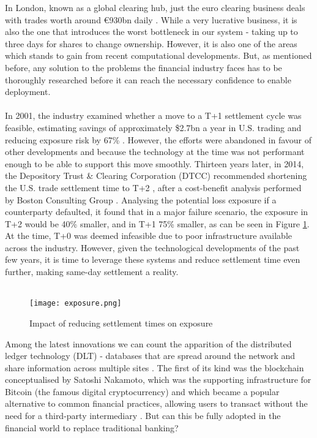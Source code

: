 \documentclass[12pt,twoside]{article}
\begin{document}
In London, known as a global clearing hub, just the euro clearing business deals with trades worth around \euro{930}bn daily \cite{euroclearing}. While a very lucrative business, it is also the one that introduces the worst bottleneck in our system - taking up to three days for shares to change ownership. However, it is also one of the areas which stands to gain from recent computational developments. But, as mentioned before, any solution to the problems the financial industry faces has to be thoroughly researched before it can reach the necessary confidence to enable deployment.
\\ \\
In 2001, the industry examined whether a move to a T+1 settlement cycle was feasible, estimating savings of approximately \$2.7bn a year in U.S. trading \cite{sia} and reducing exposure risk by 67\% \cite{oldletter}. However, the efforts were abandoned in favour of other developments and because the technology at the time was not performant enough to be able to support this move smoothly. Thirteen years later, in 2014, the Depository Trust \& Clearing Corporation (DTCC) recommended shortening the U.S. trade settlement time to T+2 \cite{dtcc}, after a cost-benefit analysis performed by Boston Consulting Group \cite{bcg}. Analysing the potential loss exposure if a counterparty defaulted, it found that in a major failure scenario, the exposure in T+2 would be 40\% smaller, and in T+1 75\% smaller, as can be seen in Figure \ref{fig:exposure}. At the time, T+0 was deemed infeasible due to poor infrastructure available across the industry. However, given the technological developments of the past few years, it is time to leverage these systems and reduce settlement time even further, making same-day settlement a reality.
\\ \\
\begin{figure}[H]
\centering
\texttt{[image: exposure.png]}
\caption{Impact of reducing settlement times on exposure}
\centering
\label{fig:exposure}
\end{figure}

Among the latest innovations we can count the apparition of the distributed ledger technology (DLT) - databases that are spread around the network and share information across multiple sites \cite{pwc}. The first of its kind was the blockchain conceptualised by Satoshi Nakamoto, which was the supporting infrastructure for Bitcoin (the famous digital cryptocurrency) and which became a popular alternative to common financial practices, allowing users to transact without the need for a third-party intermediary \cite{blockchain}. But can this be fully adopted in the financial world to replace traditional banking?
\end{document}
